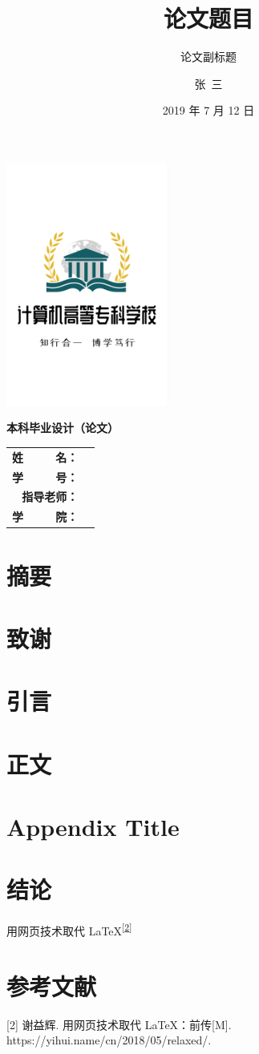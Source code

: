 \documentclass[12pt,twoside]{ctexrep}
\title{论文题目}
\subtitle{论文副标题}
\author{张\ 三}
\date{2019 年 7 月 12 日}
\makeatletter
\renewcommand*{\maketitle}{
\begin{titlepage}
   \begin{center}
       \vspace*{1cm}\par
       {\Huge\bfseries \@title}\par
       \vspace{0.5cm}
       {\Large \@subtitle }\par
       \includegraphics[width=0.4\textwidth]{logo}\par
       \vspace{1.5cm}
       \vspace{1cm}
       {\Large \bfseries 本科毕业设计（论文）}\par
       \vspace{0.8cm}
	   \begin{tabular}[h]{rc}
       \textbf{姓~~~~~名：} & \@author\\
	   \textbf{学~~~~~号：} & \@xuehao\\
	   \textbf{指导老师：} & \@supervisor\\
	   \textbf{学~~~~~院：} & \@college
	   \end{tabular}
	   \vfill
       \@date
   \end{center}
\end{titlepage}
}
\makeatother
\begin{document}
\maketitle

\chapter*{摘要}
\zhlipsum[1]
 
\chapter*{致谢}
\zhlipsum[1]
 
\tableofcontents

\chapter{引言}
\zhlipsum[1-2]

\chapter{正文}
\zhlipsum[1-15]

\appendix
\chapter{Appendix Title}
\zhlipsum[1]

\chapter{结论}
用网页技术取代 \LaTeX{}\textsuperscript{{[}\protect\hyperlink{ref-weborlatex}{2}{]}}

\chapter*{参考文献}
\leavevmode\hypertarget{ref-weborlatex}{}%
{[}2{]} 谢益辉. 用网页技术取代 LaTeX：前传{[}M{]}.
https://yihui.name/cn/2018/05/relaxed/.
\end{document}
